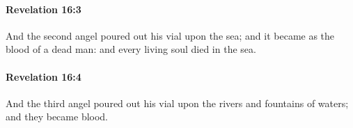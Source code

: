 		\paragraph{Revelation 16:3} %
			\label{REVELATIONNT-16-3}

			And the second angel poured out his vial upon the sea; and it became as the blood of a dead man: and every living soul died in the sea.

			\begin{framed}
			\scriptsize
				\begin{compactdesc}
					\item[SBLG] 
				\end{compactdesc}
			\end{framed}

		\paragraph{Revelation 16:4} %
			\label{REVELATIONNT-16-4}

			And the third angel poured out his vial upon the rivers and fountains of waters; and they became blood.

